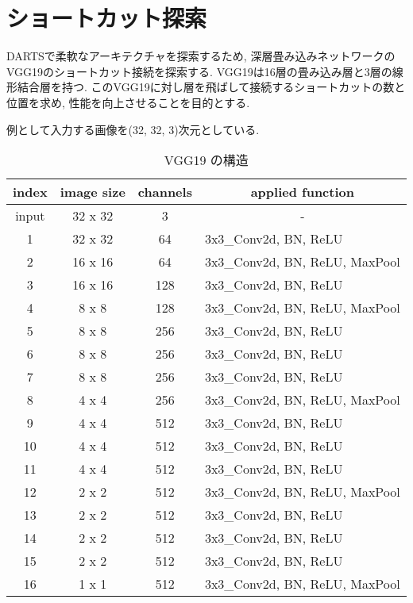 \newpage
\changeindent{0cm}
\section{ショートカット探索}
\label{sec:pred}
\changeindent{2cm}

DARTSで柔軟なアーキテクチャを探索するため,
深層畳み込みネットワークのVGG19\cite{Simonyan15}のショートカット接続を探索する.
VGG19は16層の畳み込み層と3層の線形結合層を持つ.
このVGG19に対し層を飛ばして接続するショートカットの数と位置を求め,
性能を向上させることを目的とする.

\begin{table}[t]
  \begin{center}
    \caption{VGG19 の構造}
		\vspace{-1mm}
    例として入力する画像を(32, 32, 3)次元としている.
		\vspace{1mm}
		\vspace{3mm}
    \begin{tabular}{|c|c|c|l|}
    \hline
    \textbf{index} & \textbf{image size} & \textbf{channels} & \multicolumn{1}{c|}{\textbf{applied function}} \\ \hline
    input & 32 x 32 & 3   & \multicolumn{1}{c|}{-}         \\ \hline
    1     & 32 x 32 & 64  & 3x3\_Conv2d, BN, ReLU          \\ \hline
    2     & 16 x 16 & 64  & 3x3\_Conv2d, BN, ReLU, MaxPool \\ \hline
    3     & 16 x 16 & 128 & 3x3\_Conv2d, BN, ReLU          \\ \hline
    4     & 8 x 8   & 128 & 3x3\_Conv2d, BN, ReLU, MaxPool \\ \hline
    5     & 8 x 8   & 256 & 3x3\_Conv2d, BN, ReLU          \\ \hline
    6     & 8 x 8   & 256 & 3x3\_Conv2d, BN, ReLU          \\ \hline
    7     & 8 x 8   & 256 & 3x3\_Conv2d, BN, ReLU          \\ \hline
    8     & 4 x 4   & 256 & 3x3\_Conv2d, BN, ReLU, MaxPool \\ \hline
    9     & 4 x 4   & 512 & 3x3\_Conv2d, BN, ReLU          \\ \hline
    10    & 4 x 4   & 512 & 3x3\_Conv2d, BN, ReLU          \\ \hline
    11    & 4 x 4   & 512 & 3x3\_Conv2d, BN, ReLU          \\ \hline
    12    & 2 x 2   & 512 & 3x3\_Conv2d, BN, ReLU, MaxPool \\ \hline
    13    & 2 x 2   & 512 & 3x3\_Conv2d, BN, ReLU          \\ \hline
    14    & 2 x 2   & 512 & 3x3\_Conv2d, BN, ReLU          \\ \hline
    15    & 2 x 2   & 512 & 3x3\_Conv2d, BN, ReLU          \\ \hline
    16    & 1 x 1   & 512 & 3x3\_Conv2d, BN, ReLU, MaxPool \\ \hline
    \end{tabular}
    \label{tab:vgg}
  \end{center}
\end{table}


